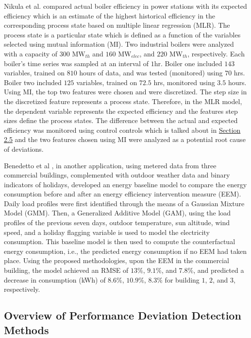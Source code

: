 Nikula et al.\cite{boiler} compared actual boiler efficiency in power stations with its expected efficiency which is an estimate of the highest historical efficiency in the corresponding process state based on multiple linear regression (MLR). The process state is a particular state which is defined as a function of the variables selected using mutual information (MI). Two industrial boilers were analyzed with a capacity of $300$ $\text{MW}_{th}$ and $160$ $\text{MW}_{elec}$, and $220$ $\text{MW}_{th}$, respectively. Each boiler's time series was sampled at an interval of $1$hr. Boiler one included $143$ variables, trained on $810$ hours of data, and was tested (monitored) using $70$ hrs. Boiler two included $125$ variables, trained on $72.5$ hrs, monitored using $3.5$ hours. Using MI, the top two features were chosen and were discretized. The step size in the discretized feature represents a process state. Therefore, in the MLR model, the dependent variable represents the expected efficiency and the features step sizes define the process states. The difference between the actual and expected efficiency was monitored using control controls which is talked about in \hyperlink{subsection.2.5}{Section 2.5} and the two features chosen using MI were analyzed as a potential root cause of deviations.

Benedetto et al \cite{data-driven-MV}, in another application, using metered data from three commercial buildings, complemented with outdoor weather data and binary indicators of holidays, developed an energy baseline model to compare the energy consumption before and after an energy efficiency intervention measure (EEM). Daily load profiles were first identified through the means of a Gaussian Mixture Model (GMM). Then, a Generalized Additive Model (GAM), using the load profiles of the previous seven days, outdoor temperature, sun altitude, wind speed, and a holiday flagging variable is used to model the electricity consumption. This baseline model is then used to compute the counterfactual energy consumption, i.e., the predicted energy consumption if no EEM had taken place. Using the proposed methodologies, upon the EEM in the commercial building, the model achieved an RMSE of $13\%$, $9.1\%$, and $7.8\%$, and predicted a decrease in consumption (kWh) of $8.6\%$, $10.9\%$, $8.3\%$ for building $1$, $2$, and $3$, respectively.

\subsection{Overview of Performance Deviation Detection Methods}

